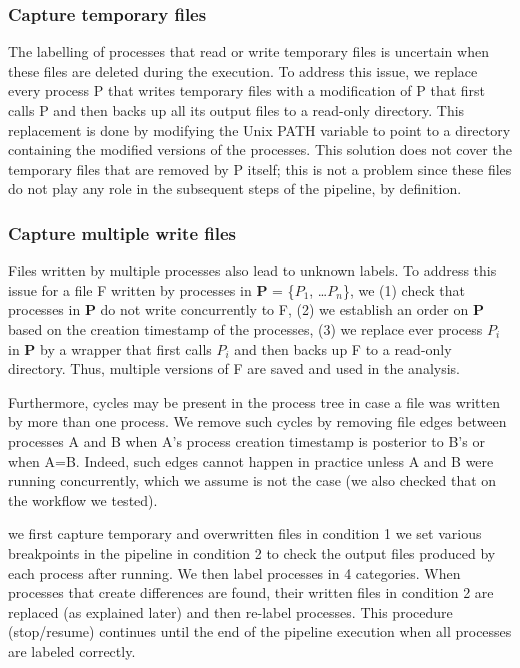 \documentclass[a4paper,num-refs]{oup-contemporary}
\begin{document}
\subsubsection{Capture temporary files} 
The labelling of processes that read or 
write temporary files is uncertain when these files are deleted during 
the execution. To address this issue, we replace every process P that 
writes temporary files with a modification of P that first calls P and 
then backs up all its output files to a read-only directory. This 
replacement is done by modifying the Unix PATH variable to point to a 
directory containing the modified versions of the processes. This 
solution does not cover the temporary files that are removed by P 
itself; this is not a problem since these files do not play any role in 
the subsequent steps of the pipeline, by definition. 

\subsubsection{Capture multiple write files} 
Files written by multiple processes also lead 
to unknown labels. To address this issue for a file F 
written by processes in \textbf{P} = \{$P_{1}$, \ldots $P_{n}$\}, we 
(1) check that processes in \textbf{P} do not write concurrently to F, 
(2) we establish an order on \textbf{P} based on the creation timestamp 
of the processes, (3) we replace ever process $P_{i}$ in \textbf{P} by 
a wrapper that first calls $P_{i}$ and then backs up F to a read-only 
directory. Thus, multiple versions of F are saved and used in the 
analysis. 

Furthermore, cycles may be present in the process tree in case a file 
was written by more than one process. We remove such cycles by removing 
file edges between processes A and B when A's process creation 
timestamp is posterior to B's or when A=B. Indeed, such edges cannot 
happen in practice unless A and B were running concurrently, which we 
assume is not the case (we also checked that on the workflow we 
tested). 


we first capture temporary and overwritten files in condition 1
we set various 
breakpoints in the pipeline in condition 2 to check the output files 
produced by each process after running. We then label processes in 4 
categories. When processes that create differences are 
found, their written files in condition 2 are replaced (as explained 
later) and then re-label processes. This procedure (stop/resume) 
continues until the end of the pipeline execution when all processes 
are labeled correctly. 
\end{document}

